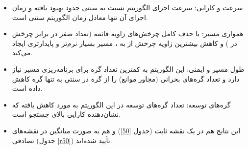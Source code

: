 \begin{itemize}
	\item سرعت و کارایی: سرعت اجرای الگوریتم  نسبت به  سنتی حدود  بهبود یافته و زمان اجرای آن تنها معادل  زمان الگوریتم  سنتی است.
	
	\item همواری مسیر:  با حذف کامل چرخش‌های زاویه قائمه (تعداد صفر در برابر  چرخش در ) و کاهش بیشترین زاویه چرخش از  به ، مسیر بسیار نرم‌تر و پایدارتری ایجاد می‌کند.
	
	\item طول مسیر و ایمنی: این الگوریتم به کمترین تعداد گره برای برنامه‌ریزی مسیر نیاز دارد و تعداد گره‌های بحرانی (مجاور موانع) را از  گره در  سنتی به تنها  گره کاهش داده است.
	
	\item گره‌های توسعه: تعداد گره‌های توسعه در این الگوریتم به  مورد کاهش یافته که نشان‌دهنده کارایی بالای جستجو است.
	
	\item این نتایج هم در یک نقشه ثابت (جدول \ref{50}) و هم به صورت میانگین در نقشه‌های تصادفی (جدول \ref{r50}) تأیید شده‌اند.
	
	\begin{table}[H]
		\centering
		\caption{ نتایج شبیه‌سازی چهار الگوریتم روی نقشه  }
		\setlength{\arrayrulewidth}{1pt}
		\setlength{\tabcolsep}{10pt}
		\renewcommand{\arraystretch}{1.5}
		\label{50}
	\end{table}
	

\end{itemize}
